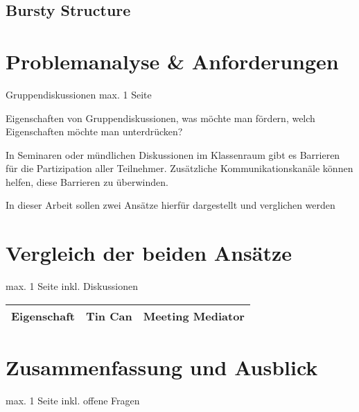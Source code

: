\documentclass{seminarvorlage}
\begin{document}
\subsection{Bursty Structure}

\section{Problemanalyse \& Anforderungen}
Gruppendiskussionen
max. 1 Seite

 Eigenschaften von Gruppendiskussionen, was möchte man fördern, welch Eigenschaften möchte man unterdrücken?
 
 In Seminaren oder mündlichen Diskussionen im Klassenraum gibt es Barrieren für die Partizipation aller Teilnehmer. Zusätzliche Kommunikationskanäle können helfen, diese Barrieren zu überwinden.

In dieser Arbeit sollen zwei Ansätze hierfür dargestellt und verglichen werden






\section{Vergleich der beiden Ansätze}
max. 1 Seite
inkl. Diskussionen

\begin{tabular}{ l | l | l }
  Eigenschaft & Tin Can & Meeting Mediator \\
  \hline
\end{tabular}


\section{Zusammenfassung und Ausblick}
max. 1 Seite
inkl. offene Fragen
% 
\end{document}
